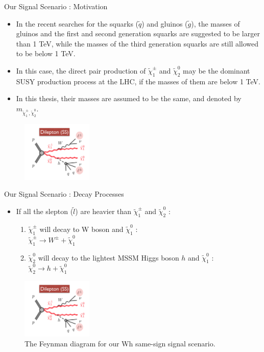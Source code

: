 \documentclass[mathserif,serif]{beamer}
\begin{document}
\begin{frame}{Our Signal Scenario : Motivation}
\begin{itemize}
\item In the recent searches for the squarks ($\tilde{q}$) and gluinos ($\tilde{g}$), the masses of gluinos and the first and second generation squarks are suggested to be larger than 1 TeV, while the masses of the third generation squarks are still allowed to be below 1 TeV.
\item In this case, the direct pair production of $\tilde{\chi}_1^\pm$  and $\tilde{\chi}_2^0$ may be the dominant SUSY production process at the LHC, if the masses of them are below 1 TeV.
\item In this thesis, their masses are assumed to be the same, and denoted by $m_{\tilde{\chi}_1^\pm , \tilde{\chi}_2^0}$.
\end{itemize}
\begin{figure}
\centering
\includegraphics[width=0.3\textwidth]{data/photo/theory/signal_feynman.png}
\end{figure}
\end{frame}

\begin{frame}{Our Signal Scenario : Decay Processes}
\begin{itemize}
\item If all the slepton ($\tilde{l}$) are heavier than $\tilde{\chi}_1^\pm$ and $\tilde{\chi}_2^0$ :
\begin{enumerate}
\item $\tilde{\chi}_1^\pm$ will decay to W boson and $\tilde{\chi}_1^0$ : \\
$\tilde{\chi}_1^\pm \rightarrow W^{\pm} + \tilde{\chi}_1^0$
\item $\tilde{\chi}_2^0$ will decay to the lightest MSSM Higgs boson $h$ and $\tilde{\chi}_1^0$ : \\
$\tilde{\chi}_2^0 \rightarrow h + \tilde{\chi}_1^0$
\end{enumerate}
\end{itemize}
\begin{figure}
\centering
\includegraphics[width=0.3\textwidth]{data/photo/theory/signal_feynman.png}
\caption{The Feynman diagram for our Wh same-sign signal scenario.}
\end{figure}
\end{frame}
\end{document}
